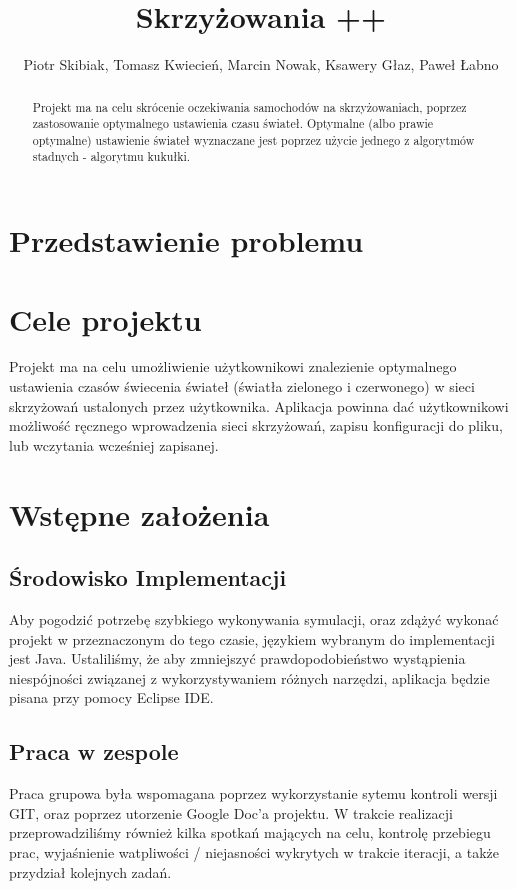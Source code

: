 \documentclass{article}
\title {Skrzyżowania ++}
\author{Piotr Skibiak, Tomasz Kwiecień, Marcin Nowak, Ksawery Głaz, Paweł Łabno}
\institute{AGH, Wydział IEiT, Informatyka}
\begin{document}
\maketitle

\begin{abstract}
Projekt ma na celu skrócenie oczekiwania samochodów na skrzyżowaniach, poprzez zastosowanie optymalnego ustawienia czasu świateł. Optymalne (albo prawie optymalne) ustawienie świateł wyznaczane jest poprzez użycie jednego z algorytmów stadnych - algorytmu kukułki.   
\end{abstract}

\newpage
\renewcommand*\contentsname{Spis Treści}
\tableofcontents
\setcounter{tocdepth}{3}

\newpage

\section{Przedstawienie problemu}



\section{Cele projektu}
    Projekt ma na celu umożliwienie użytkownikowi znalezienie optymalnego ustawienia czasów świecenia świateł (światła zielonego i czerwonego) w sieci skrzyżowań ustalonych przez użytkownika. Aplikacja powinna dać użytkownikowi możliwość ręcznego wprowadzenia sieci skrzyżowań, zapisu konfiguracji do pliku, lub wczytania wcześniej zapisanej. 

\section{Wstępne założenia}
\subsection{Środowisko Implementacji}
    Aby pogodzić potrzebę szybkiego wykonywania symulacji, oraz zdążyć wykonać projekt w przeznaczonym do tego czasie, językiem wybranym do implementacji jest Java. Ustaliliśmy, że aby zmniejszyć prawdopodobieństwo wystąpienia niespójności związanej z wykorzystywaniem różnych narzędzi, aplikacja będzie pisana przy pomocy Eclipse IDE. 

\subsection{Praca w zespole}
    Praca grupowa była wspomagana poprzez wykorzystanie sytemu kontroli wersji GIT, oraz poprzez utorzenie Google Doc'a projektu. W trakcie realizacji przeprowadziliśmy również kilka spotkań mających na celu, kontrolę przebiegu prac, wyjaśnienie watpliwości / niejasności wykrytych w trakcie iteracji, a także przydział kolejnych zadań.
\end{document}
